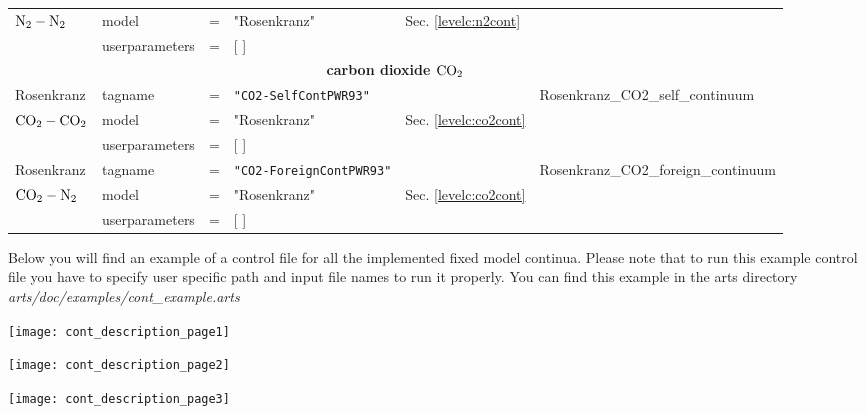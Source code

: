 {\begin{landscape}
\begin{longtable}{llllll}
$\mbox{N}_2-\mbox{N}_2$   & model &=& "Rosenkranz" &  {\small Sec. \ref{levelc:n2cont}} &  \\ 
            & userparameters &=& [ ] &   & \\
 \hline
 \multicolumn{6}{c}{{\bf carbon dioxide $\mbox{CO}_2$}}\\
 \hline
 Rosenkranz & tagname &=& {\small \tt "CO2-SelfContPWR93"} & {\small \cite{pwr:93}} & 
              {\small Rosenkranz\_CO2\_self\_continuum}\\
$\mbox{CO}_2-\mbox{CO}_2$ & model &=& "Rosenkranz" &   {\small Sec. \ref{levelc:co2cont}} &  \\  
            & userparameters &=& [ ] &   & \\

 Rosenkranz & tagname &=& {\small \tt "CO2-ForeignContPWR93"} & {\small \cite{pwr:93}} & 
              {\small Rosenkranz\_CO2\_foreign\_continuum}\\
$\mbox{CO}_2-\mbox{N}_2$  & model &=& "Rosenkranz" &  {\small Sec. \ref{levelc:co2cont}}  &  \\  
            & userparameters &=& [ ] &   & \\

 \hline
 \end{longtable}
 \setlength{\LTcapwidth}{0.8\textwidth}
\end{landscape}



\label{leveld:ArtsContExampleControlFile}
Below you will find an example of a control file for all 
the implemented fixed model continua. Please note that
to run this example control file you have to specify
user specific path and input file names to run it 
properly. You can find this example in the arts directory 
{\it arts/doc/examples/cont\_example.arts}



\begin{flushleft}
 \texttt{[image: cont\_description\_page1]}
\end{flushleft}
\begin{flushleft}
 \texttt{[image: cont\_description\_page2]}
\end{flushleft}
\begin{flushleft}
 \texttt{[image: cont\_description\_page3]}
\end{flushleft}



}
